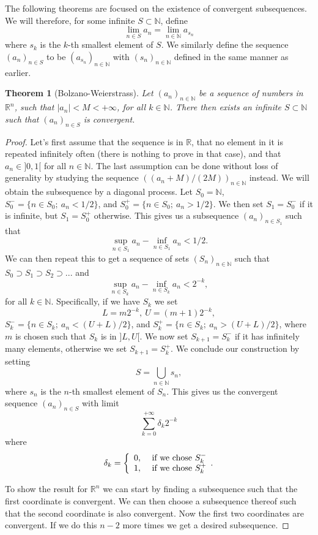 \documentclass[a4paper,12pt,twoside,BCOR=10mm]{scrbook}
\newtheorem{theorem}{Theorem}[section]
\theoremstyle{definition}
\theoremstyle{definition}
\theoremstyle{definition}
\begin{document}
\label{index19}
The following theorems are focused on the existence of convergent subsequences.
We will therefore, for some infinite $S \subset \mathbb{N}$, define
\[
	\lim_{n \in S} a_n = \lim_{n \in \mathbb{N}} a_{s_n}
\]
where $s_k$ is the $k$-th smallest element of $S$.
We similarly define the sequence $(a_n)_{n \in S}$ to be $(a_{s_n})_{n \in \mathbb{N}}$ with $(s_n)_{n \in \mathbb{N}}$ defined in the same manner as earlier.
\begin{theorem}[Bolzano-Weierstrass]
Let $(a_n)_{n \in \mathbb{N}}$ be a sequence of numbers in $\mathbb{R}^n$, such that $|a_n| < M < +\infty$, for all $k \in \mathbb{N}$.
There then exists an infinite $S \subset \mathbb{N}$ such that $(a_n)_{n \in S}$ is convergent.
\end{theorem}
\begin{proof}
Let's first assume that the sequence is in $\mathbb{R}$,
	that no element in it is repeated infinitely often (there is nothing to prove in that case),
	and that $a_n \in ]0, 1[$ for all $n \in \mathbb{N}$.
The last assumption can be done without loss of generality by studying the sequence $((a_n + M)/(2M))_{n \in \mathbb{N}}$ instead.
We will obtain the subsequence by a diagonal process.
Let $S_0 = \mathbb{N}$, $S_0^- = \{n \in S_0;\ a_n < 1/2\}$, and $S_0^+ = \{n \in S_0;\ a_n > 1/2\}$.
We then set $S_1 = S_0^-$ if it is infinite, but $S_1 = S_0^+$ otherwise.
This gives us a subsequence $(a_n)_{n \in S_1}$ such that
\[
	\sup_{n \in S_1} a_n - \inf_{n \in S_1} a_n < 1/2.
\]
We can then repeat this to get a sequence of sets $(S_n)_{n \in \mathbb{N}}$ such that $S_0 \supset S_1 \supset S_2 \supset...$ and 
\[
	\sup_{n \in S_k} a_n - \inf_{n \in S_k} a_n < 2^{-k},
\]
for all $k \in \mathbb{N}$.
Specifically, if we have $S_k$ we set
\[
	L = m2^{-k},\ 
	U = (m + 1)2^{-k},
\]
$S_k^- = \{n \in S_k;\ a_n < (U + L)/2\}$, and $S_k^+ = \{n \in S_k;\ a_n > (U + L)/2\}$, where $m$ is chosen such that $S_k$ is in $]L, U[$.
We now set $S_{k + 1} = S_k^-$ if it has infinitely many elements, otherwise we set $S_{k + 1} = S_k^+$.
We conclude our construction by setting
\[
	S = \bigcup_{n \in \mathbb{N}} s_n,
\]
where $s_n$ is the $n$-th smallest element of $S_n$.
This gives us the convergent sequence $(a_n)_{n \in S}$ with limit
\[
	\sum_{k = 0}^{+\infty} \delta_k 2^{-k}
\]
where
\[
	\delta_k = \left \{
	\begin{array}{c c}
		0,\ & \text{if we chose } S_k^- \\
		1,\ & \text{if we chose } S_k^+
	\end{array}.
	\right .
\]

To show the result for $\mathbb{R}^n$ we can start by finding a subsequence such that the first coordinate is convergent.
We can then choose a subsequence thereof such that the second coordinate is also convergent.
Now the first two coordinates are convergent.
If we do this $n - 2$ more times we get a desired subsequence.
\end{proof}
\end{document}
